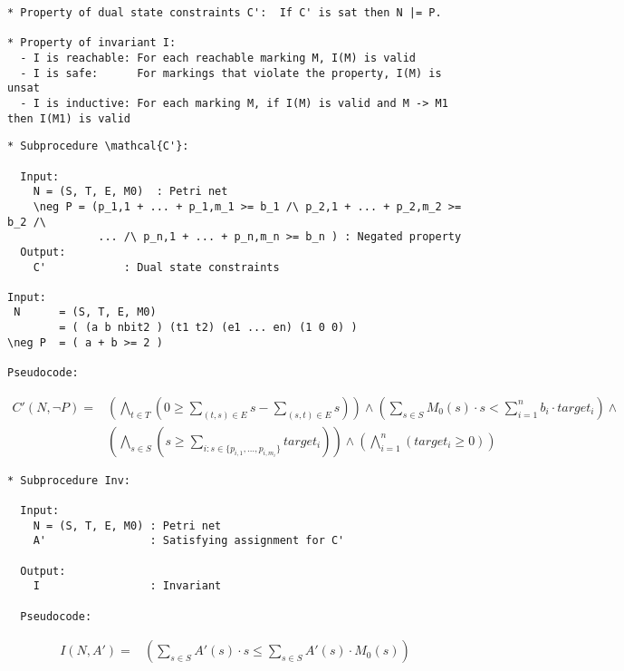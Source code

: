 \documentclass{llncs}
\begin{document}
\begin{verbatim}
* Property of dual state constraints C':  If C' is sat then N |= P.

* Property of invariant I:
  - I is reachable: For each reachable marking M, I(M) is valid
  - I is safe:      For markings that violate the property, I(M) is unsat
  - I is inductive: For each marking M, if I(M) is valid and M -> M1 then I(M1) is valid
\end{verbatim}

\newpage

\begin{verbatim}
* Subprocedure \mathcal{C'}:

  Input:
    N = (S, T, E, M0)  : Petri net
    \neg P = (p_1,1 + ... + p_1,m_1 >= b_1 /\ p_2,1 + ... + p_2,m_2 >= b_2 /\
              ... /\ p_n,1 + ... + p_n,m_n >= b_n ) : Negated property
  Output:
    C'            : Dual state constraints

Input:
 N      = (S, T, E, M0)
        = ( (a b nbit2 ) (t1 t2) (e1 ... en) (1 0 0) )
\neg P  = ( a + b >= 2 )

Pseudocode:
\end{verbatim}

\begin{align*}
  C'(N, \neg P) =& \left( \bigwedge_{t \in T} \left( 0 \ge
                      \sum_{(t, s) \in E} s
                    - \sum_{(s, t) \in E} s \right) \right) \land
     \left( \sum_{s \in S} M_0(s) \cdot s <
       \sum_{i=1}^n b_i \cdot target_i \right) \land \\
     & \left( \bigwedge_{s \in S} \left ( s \ge 
       \sum_{i : s \in \{ p_{i,1}, \ldots, p_{i,m_i} \} } target_i \right) \right) \land
     \left( \bigwedge_{i=1}^n \left( target_i \ge 0 \right) \right)
\end{align*}

\begin{verbatim}
* Subprocedure Inv:

  Input:
    N = (S, T, E, M0) : Petri net
    A'                : Satisfying assignment for C'

  Output:
    I                 : Invariant

  Pseudocode:
\end{verbatim}

\begin{align*}
  I(N, A') =& \left( \sum_{s \in S} A'(s) \cdot s \le
                     \sum_{s \in S} A'(s) \cdot M_0(s) \right)
\end{align*}
\end{document}
